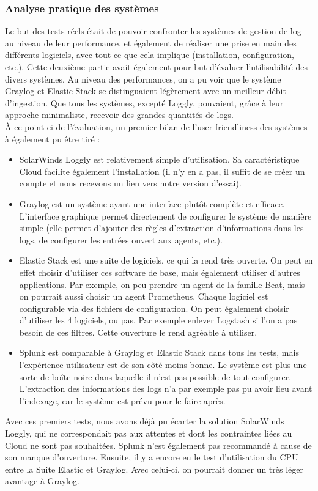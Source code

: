 \documentclass[paper=a4, fontsize=11pt]{scrartcl}
\begin{document}
\subsubsection{Analyse pratique des systèmes}
Le but des tests réels était de pouvoir confronter les systèmes de gestion de log au niveau de leur performance, et également de réaliser une prise en main des différents logiciels, avec tout ce que cela implique (installation, configuration, etc.). Cette deuxième partie avait également pour but d'évaluer l'utilisabilité des divers systèmes.
Au niveau des performances, on a pu voir que le système Graylog et Elastic Stack se distinguaient légèrement avec un meilleur débit d'ingestion. Que tous les systèmes, excepté Loggly, pouvaient, grâce à leur approche minimaliste, recevoir des grandes quantités de logs.\\
À ce point-ci de l'évaluation, un premier bilan de l'\og user-friendliness \fg des systèmes à également pu être tiré :
\begin{itemize}
    \item SolarWinds Loggly est relativement simple d'utilisation. Sa caractéristique Cloud facilite également l'installation (il n'y en a pas, il suffit de se créer un compte et nous recevons un lien vers notre version d'essai).
    \item Graylog est un système ayant une interface plutôt complète et efficace. L'interface graphique permet directement de configurer le système de manière simple (elle permet d'ajouter des règles d'extraction d'informations dans les logs, de configurer les entrées ouvert aux agents, etc.).
    \item Elastic Stack est une \og suite \fg de logiciels, ce qui la rend très ouverte. On peut en effet choisir d'utiliser ces software de base, mais également utiliser d'autres applications. Par exemple, on peu prendre un agent de la famille Beat, mais on pourrait aussi choisir un agent Prometheus. Chaque logiciel est configurable via des fichiers de configuration. On peut également choisir d'utiliser les 4 logiciels, ou pas. Par exemple enlever Logstash si l'on a pas besoin de ces filtres. Cette ouverture le rend agréable à utiliser.
    \item Splunk est comparable à Graylog et Elastic Stack dans tous les tests, mais l'expérience utilisateur est de son côté moins bonne. Le système est plus une sorte de \og boîte noire \fg dans laquelle il n'est pas possible de tout configurer. L'extraction des informations des logs n'a par exemple pas pu avoir lieu avant l'indexage, car le système est prévu pour le faire après.
\end{itemize}
Avec ces premiers tests, nous avons déjà pu écarter la solution SolarWinds Loggly, qui ne correspondait pas aux attentes et dont les contraintes liées au Cloud ne sont pas souhaitées. Splunk n'est également pas recommandé à cause de son manque d'ouverture.
Ensuite, il y a encore eu le test d'utilisation du CPU entre la Suite Elastic et Graylog. Avec celui-ci, on pourrait donner un très léger avantage à Graylog.
\end{document}
